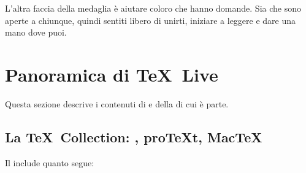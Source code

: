 \documentclass{article}
\begin{document}
L'altra faccia della medaglia è aiutare coloro che hanno domande. Sia
 che  sono aperte a chiunque, quindi
sentiti libero di unirti, iniziare a leggere e dare una mano dove puoi. 


\section{Panoramica di \protect\TeX\protect\ Live}
\label{sec:overview-tl}

Questa sezione descrive i contenuti di \TL{} e della \TK{} di cui è parte.

\subsection{La \protect\TeX\protect\ Collection: \TL, pro\TeX{}t, Mac\TeX}
\label{sec:tl-coll-dists}

Il \DVD{} \TK{} include quanto segue:
\end{document}
